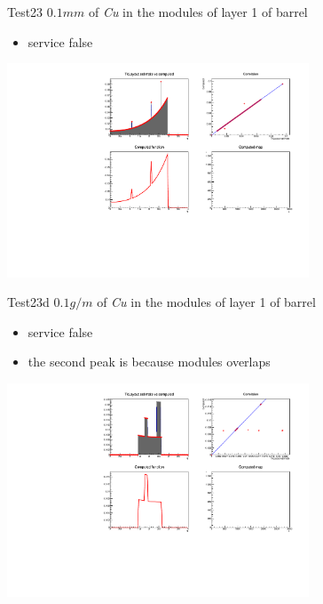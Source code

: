 \documentclass[pdftex, 11pt]{beamer}
\begin{document}
\begin{frame}
  \begin{block}{Test23}
    \alert{$0.1 mm$} of \emph{Cu} in the modules of layer 1 of barrel
    \begin{itemize}
    \item \alert{service} false
    \end{itemize}
  \end{block}
  \begin{center}
    \includegraphics[width=9cm]{img/test23.pdf}
  \end{center}
\end{frame}

\begin{frame}
  \begin{block}{Test23d}
    \alert{$0.1 g/m$} of \emph{Cu} in the modules of layer 1 of barrel
    \begin{itemize}
    \item \alert{service} false
    \item the second peak is because modules overlaps
    \end{itemize}
  \end{block}
  \begin{center}
    \includegraphics[width=9cm]{img/test23d.pdf}
  \end{center}
\end{frame}
\end{document}
